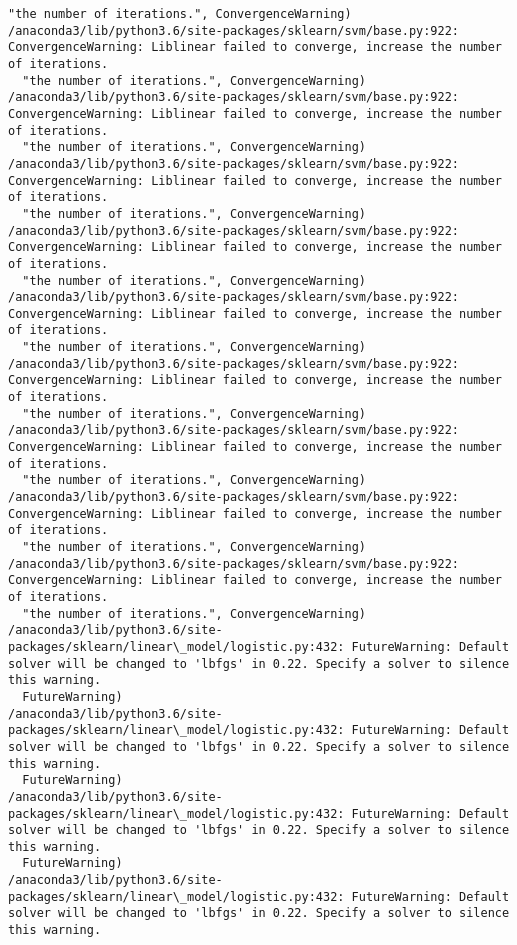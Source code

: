 \documentclass[11pt]{article}
\begin{document}
\begin{Verbatim}[commandchars=\\\{\}]
  "the number of iterations.", ConvergenceWarning)
/anaconda3/lib/python3.6/site-packages/sklearn/svm/base.py:922: ConvergenceWarning: Liblinear failed to converge, increase the number of iterations.
  "the number of iterations.", ConvergenceWarning)
/anaconda3/lib/python3.6/site-packages/sklearn/svm/base.py:922: ConvergenceWarning: Liblinear failed to converge, increase the number of iterations.
  "the number of iterations.", ConvergenceWarning)
/anaconda3/lib/python3.6/site-packages/sklearn/svm/base.py:922: ConvergenceWarning: Liblinear failed to converge, increase the number of iterations.
  "the number of iterations.", ConvergenceWarning)
/anaconda3/lib/python3.6/site-packages/sklearn/svm/base.py:922: ConvergenceWarning: Liblinear failed to converge, increase the number of iterations.
  "the number of iterations.", ConvergenceWarning)
/anaconda3/lib/python3.6/site-packages/sklearn/svm/base.py:922: ConvergenceWarning: Liblinear failed to converge, increase the number of iterations.
  "the number of iterations.", ConvergenceWarning)
/anaconda3/lib/python3.6/site-packages/sklearn/svm/base.py:922: ConvergenceWarning: Liblinear failed to converge, increase the number of iterations.
  "the number of iterations.", ConvergenceWarning)
/anaconda3/lib/python3.6/site-packages/sklearn/svm/base.py:922: ConvergenceWarning: Liblinear failed to converge, increase the number of iterations.
  "the number of iterations.", ConvergenceWarning)
/anaconda3/lib/python3.6/site-packages/sklearn/svm/base.py:922: ConvergenceWarning: Liblinear failed to converge, increase the number of iterations.
  "the number of iterations.", ConvergenceWarning)
/anaconda3/lib/python3.6/site-packages/sklearn/svm/base.py:922: ConvergenceWarning: Liblinear failed to converge, increase the number of iterations.
  "the number of iterations.", ConvergenceWarning)
/anaconda3/lib/python3.6/site-packages/sklearn/linear\_model/logistic.py:432: FutureWarning: Default solver will be changed to 'lbfgs' in 0.22. Specify a solver to silence this warning.
  FutureWarning)
/anaconda3/lib/python3.6/site-packages/sklearn/linear\_model/logistic.py:432: FutureWarning: Default solver will be changed to 'lbfgs' in 0.22. Specify a solver to silence this warning.
  FutureWarning)
/anaconda3/lib/python3.6/site-packages/sklearn/linear\_model/logistic.py:432: FutureWarning: Default solver will be changed to 'lbfgs' in 0.22. Specify a solver to silence this warning.
  FutureWarning)
/anaconda3/lib/python3.6/site-packages/sklearn/linear\_model/logistic.py:432: FutureWarning: Default solver will be changed to 'lbfgs' in 0.22. Specify a solver to silence this warning.

\end{Verbatim}
\end{document}
